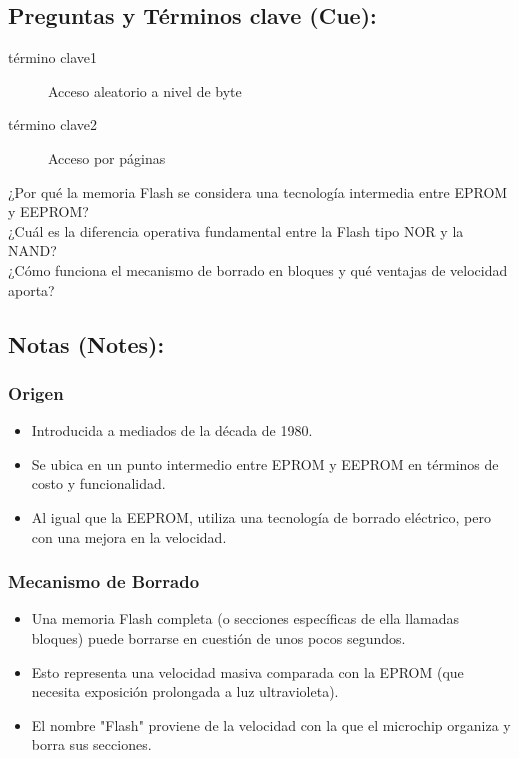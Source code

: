 \documentclass{article}
\begin{document}
\subsection{Preguntas y Términos clave (Cue):}
\label{sec:org9371639}
\begin{description}
\item[{término clave1}] Acceso aleatorio a nivel de byte
\item[{término clave2}] Acceso por páginas

\item[{¿Por qué la memoria Flash se considera una tecnología intermedia entre EPROM y EEPROM?}] 

\item[{¿Cuál es la diferencia operativa fundamental entre la Flash tipo NOR y la NAND?}] 

\item[{¿Cómo funciona el mecanismo de borrado en bloques y qué ventajas de velocidad aporta?}] 
\end{description}

\subsection{Notas (Notes):}
\label{sec:org1b730d2}
\subsubsection{Origen}
\label{sec:org3962c06}
\begin{itemize}
\item Introducida a mediados de la década de 1980.
\item Se ubica en un punto intermedio entre EPROM y EEPROM en términos de
costo y funcionalidad.
\item Al igual que la EEPROM, utiliza una tecnología de borrado eléctrico,
pero con una mejora en la velocidad.
\end{itemize}

\subsubsection{Mecanismo de Borrado}
\label{sec:orgdf4203a}
\begin{itemize}
\item Una memoria Flash completa (o secciones específicas de ella llamadas
bloques) puede borrarse en cuestión de unos pocos segundos.
\item Esto representa una velocidad masiva comparada con la EPROM (que
necesita exposición prolongada a luz ultravioleta).
\item El nombre "Flash" proviene de la velocidad con la que el microchip
organiza y borra sus secciones.
\end{itemize}
\end{document}
